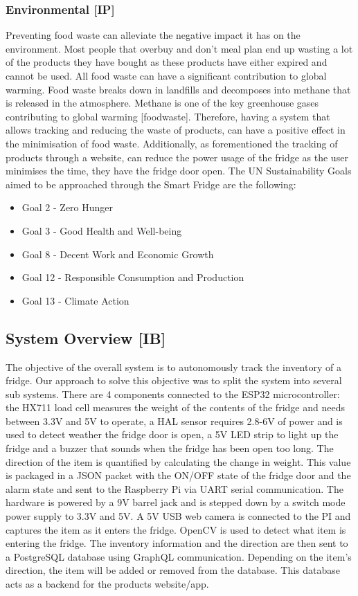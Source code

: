\subsubsection{Environmental [IP]} 
Preventing food waste can alleviate the negative impact it has on the environment.
Most people that overbuy and don't meal plan end up wasting a lot of the products they have bought as these products have either expired and cannot be used.
All food waste can have a significant contribution to global warming.
Food waste breaks down in landfills and decomposes into methane that is released in the atmosphere.
Methane is one of the key greenhouse gases contributing to global warming [foodwaste].
Therefore, having a system that allows tracking and reducing the waste of products, can have a positive effect in the minimisation of food waste.
Additionally, as forementioned the tracking of products through a website, can reduce the power usage of the fridge as the user minimises the time, they have the fridge door open.
The UN Sustainability Goals aimed to be approached through the Smart Fridge are the following:

\begin{itemize}
    \item Goal 2 - Zero Hunger
    \item Goal 3 - Good Health and Well-being
    \item Goal 8 - Decent 	Work and Economic Growth
    \item Goal 12 - Responsible Consumption and Production
    \item Goal 13 - Climate Action 
\end{itemize}

\subsection{System Overview [IB]}
The objective of the overall system is to autonomously track the inventory of a fridge.
Our approach to solve this objective was to split the system into several sub systems.
There are 4 components connected to the ESP32 microcontroller: the HX711 load cell measures the weight of the contents of the fridge and needs between 3.3V and 5V to operate, a HAL sensor requires 2.8-6V of power and is used to detect weather the fridge door is open, a 5V LED strip to light up the fridge and a buzzer that sounds when the fridge has been open too long.
The direction of the item is quantified by calculating the change in weight.
This value is packaged in a JSON packet with the ON/OFF state of the fridge door and the alarm state and sent to the Raspberry Pi via UART serial communication.
The hardware is powered by a 9V barrel jack and is stepped down by a switch mode power supply to 3.3V and 5V.
A 5V USB web camera is connected to the PI and captures the item as it enters the fridge.
OpenCV is used to detect what item is entering the fridge.
The inventory information and the direction are then sent to a PostgreSQL database using GraphQL communication.
Depending on the item's direction, the item will be added or removed from the database.
This database acts as a backend for the products website/app.

